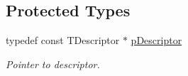 \subsection*{Protected Types}
\begin{DoxyCompactItemize}
\item 
\mbox{\label{classDBoW2_1_1TemplatedVocabulary_a40913d67e369e6993c2eab80a968f829}} 
typedef const T\+Descriptor $\ast$ \hyperlink{classDBoW2_1_1TemplatedVocabulary_a40913d67e369e6993c2eab80a968f829}{p\+Descriptor}
\begin{DoxyCompactList}\small\item\em Pointer to descriptor. \end{DoxyCompactList}\end{DoxyCompactItemize}
